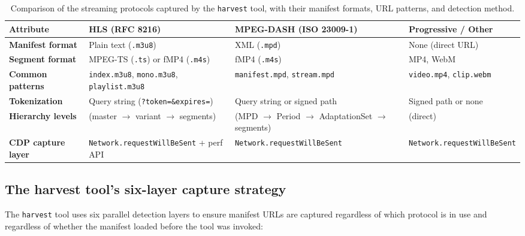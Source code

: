 \begin{table}[H]
\centering
\begin{tabularx}{\textwidth}{>{\raggedright\arraybackslash\bfseries}p{2.8cm}
                              >{\raggedright\arraybackslash}X
                              >{\raggedright\arraybackslash}X
                              >{\raggedright\arraybackslash}X}
\toprule
\rowcolor{accent!8}
Attribute & HLS (RFC 8216) & MPEG-DASH (ISO 23009-1) & Progressive / Other \\
\midrule
Manifest format & Plain text (\texttt{.m3u8}) & XML (\texttt{.mpd}) &
  None (direct URL) \\
Segment format & MPEG-TS (\texttt{.ts}) or fMP4 (\texttt{.m4s}) &
  fMP4 (\texttt{.m4s}) & MP4, WebM \\
Common patterns & \texttt{index.m3u8}, \texttt{mono.m3u8},
  \texttt{playlist.m3u8} & \texttt{manifest.mpd}, \texttt{stream.mpd} &
  \texttt{video.mp4}, \texttt{clip.webm} \\
Tokenization & Query string \newline(\texttt{?token=\&expires=}) &
  Query string or signed path & Signed path or none \\
Hierarchy levels & 2 (master $\to$ variant $\to$ segments) &
  4 (MPD $\to$ Period $\to$ AdaptationSet $\to$ segments) & 1 (direct) \\
CDP capture layer & \texttt{Network.requestWill}\newline\texttt{BeSent} + perf API &
  \texttt{Network.requestWill}\newline\texttt{BeSent} &
  \texttt{Network.requestWill}\newline\texttt{BeSent} \\
\bottomrule
\end{tabularx}
\caption{Comparison of the streaming protocols captured by the \texttt{harvest} tool,
with their manifest formats, URL patterns, and detection method.}
\label{tab:protocol-compare}
\end{table}

\subsection{The harvest tool's six-layer capture strategy}

The \texttt{harvest} tool uses six parallel detection layers to ensure manifest URLs are
captured regardless of which protocol is in use and regardless of whether the manifest
loaded before the tool was invoked:

